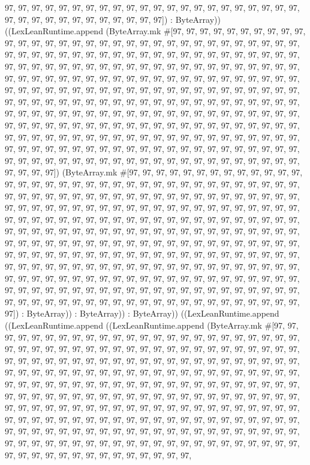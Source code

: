 \documentclass[11pt]{article}
\begin{document}
97, 97, 97, 97, 97, 97, 97, 97, 97, 97, 97, 97, 97, 97, 97, 97, 97, 97, 97, 97, 97, 97, 97, 97, 97, 97, 97, 97, 97, 97, 97, 97, 97, 97]) : ByteArray)) ((LexLeanRuntime.append (ByteArray.mk \#[97, 97, 97, 97, 97, 97, 97, 97, 97, 97, 97, 97, 97, 97, 97, 97, 97, 97, 97, 97, 97, 97, 97, 97, 97, 97, 97, 97, 97, 97, 97, 97, 97, 97, 97, 97, 97, 97, 97, 97, 97, 97, 97, 97, 97, 97, 97, 97, 97, 97, 97, 97, 97, 97, 97, 97, 97, 97, 97, 97, 97, 97, 97, 97, 97, 97, 97, 97, 97, 97, 97, 97, 97, 97, 97, 97, 97, 97, 97, 97, 97, 97, 97, 97, 97, 97, 97, 97, 97, 97, 97, 97, 97, 97, 97, 97, 97, 97, 97, 97, 97, 97, 97, 97, 97, 97, 97, 97, 97, 97, 97, 97, 97, 97, 97, 97, 97, 97, 97, 97, 97, 97, 97, 97, 97, 97, 97, 97, 97, 97, 97, 97, 97, 97, 97, 97, 97, 97, 97, 97, 97, 97, 97, 97, 97, 97, 97, 97, 97, 97, 97, 97, 97, 97, 97, 97, 97, 97, 97, 97, 97, 97, 97, 97, 97, 97, 97, 97, 97, 97, 97, 97, 97, 97, 97, 97, 97, 97, 97, 97, 97, 97, 97, 97, 97, 97, 97, 97, 97, 97, 97, 97, 97, 97, 97, 97, 97, 97, 97, 97, 97, 97, 97, 97, 97, 97, 97, 97, 97, 97, 97, 97, 97, 97, 97, 97, 97, 97, 97, 97, 97, 97, 97, 97, 97, 97, 97, 97, 97, 97, 97, 97, 97, 97, 97, 97, 97, 97, 97, 97, 97, 97, 97, 97, 97, 97, 97, 97, 97, 97, 97, 97, 97, 97, 97, 97]) (ByteArray.mk \#[97, 97, 97, 97, 97, 97, 97, 97, 97, 97, 97, 97, 97, 97, 97, 97, 97, 97, 97, 97, 97, 97, 97, 97, 97, 97, 97, 97, 97, 97, 97, 97, 97, 97, 97, 97, 97, 97, 97, 97, 97, 97, 97, 97, 97, 97, 97, 97, 97, 97, 97, 97, 97, 97, 97, 97, 97, 97, 97, 97, 97, 97, 97, 97, 97, 97, 97, 97, 97, 97, 97, 97, 97, 97, 97, 97, 97, 97, 97, 97, 97, 97, 97, 97, 97, 97, 97, 97, 97, 97, 97, 97, 97, 97, 97, 97, 97, 97, 97, 97, 97, 97, 97, 97, 97, 97, 97, 97, 97, 97, 97, 97, 97, 97, 97, 97, 97, 97, 97, 97, 97, 97, 97, 97, 97, 97, 97, 97, 97, 97, 97, 97, 97, 97, 97, 97, 97, 97, 97, 97, 97, 97, 97, 97, 97, 97, 97, 97, 97, 97, 97, 97, 97, 97, 97, 97, 97, 97, 97, 97, 97, 97, 97, 97, 97, 97, 97, 97, 97, 97, 97, 97, 97, 97, 97, 97, 97, 97, 97, 97, 97, 97, 97, 97, 97, 97, 97, 97, 97, 97, 97, 97, 97, 97, 97, 97, 97, 97, 97, 97, 97, 97, 97, 97, 97, 97, 97, 97, 97, 97, 97, 97, 97, 97, 97, 97, 97, 97, 97, 97, 97, 97, 97, 97, 97, 97, 97, 97, 97, 97, 97, 97, 97, 97, 97, 97, 97, 97, 97, 97, 97, 97, 97, 97, 97, 97, 97, 97, 97, 97, 97, 97, 97, 97, 97, 97]) : ByteArray)) : ByteArray)) : ByteArray)) ((LexLeanRuntime.append ((LexLeanRuntime.append ((LexLeanRuntime.append (ByteArray.mk \#[97, 97, 97, 97, 97, 97, 97, 97, 97, 97, 97, 97, 97, 97, 97, 97, 97, 97, 97, 97, 97, 97, 97, 97, 97, 97, 97, 97, 97, 97, 97, 97, 97, 97, 97, 97, 97, 97, 97, 97, 97, 97, 97, 97, 97, 97, 97, 97, 97, 97, 97, 97, 97, 97, 97, 97, 97, 97, 97, 97, 97, 97, 97, 97, 97, 97, 97, 97, 97, 97, 97, 97, 97, 97, 97, 97, 97, 97, 97, 97, 97, 97, 97, 97, 97, 97, 97, 97, 97, 97, 97, 97, 97, 97, 97, 97, 97, 97, 97, 97, 97, 97, 97, 97, 97, 97, 97, 97, 97, 97, 97, 97, 97, 97, 97, 97, 97, 97, 97, 97, 97, 97, 97, 97, 97, 97, 97, 97, 97, 97, 97, 97, 97, 97, 97, 97, 97, 97, 97, 97, 97, 97, 97, 97, 97, 97, 97, 97, 97, 97, 97, 97, 97, 97, 97, 97, 97, 97, 97, 97, 97, 97, 97, 97, 97, 97, 97, 97, 97, 97, 97, 97, 97, 97, 97, 97, 97, 97, 97, 97, 97, 97, 97, 97, 97, 97, 97, 97, 97, 97, 97, 97, 97, 97, 97, 97, 97, 97, 97, 97, 97, 97, 97, 97, 97, 97, 97, 97, 97, 97, 97, 97, 97, 97, 97, 97, 97, 97, 97, 97, 97, 97, 97, 97, 97, 97, 97, 97, 97, 97, 97, 97, 97, 97, 97, 97, 
\end{document}
